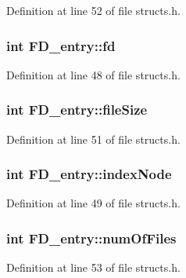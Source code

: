 Definition at line 52 of file structs.\-h.

\hypertarget{struct_f_d__entry_a9d5e0d0d64fc6fceda961322163b6620}{
\subsubsection[{fd}]{\setlength{\rightskip}{0pt plus 5cm}int F\-D\-\_\-entry\-::fd}}\label{struct_f_d__entry_a9d5e0d0d64fc6fceda961322163b6620}


Definition at line 48 of file structs.\-h.

\hypertarget{struct_f_d__entry_ab206b321649292d979ed9e30c7c9758e}{
\subsubsection[{file\-Size}]{\setlength{\rightskip}{0pt plus 5cm}int F\-D\-\_\-entry\-::file\-Size}}\label{struct_f_d__entry_ab206b321649292d979ed9e30c7c9758e}


Definition at line 51 of file structs.\-h.

\hypertarget{struct_f_d__entry_a8461f9539fc8eae9aa1d82a1bd6fe99b}{
\subsubsection[{index\-Node}]{\setlength{\rightskip}{0pt plus 5cm}int F\-D\-\_\-entry\-::index\-Node}}\label{struct_f_d__entry_a8461f9539fc8eae9aa1d82a1bd6fe99b}


Definition at line 49 of file structs.\-h.

\hypertarget{struct_f_d__entry_a2db15c840d91b43d3073b88e41d88fe9}{
\subsubsection[{num\-Of\-Files}]{\setlength{\rightskip}{0pt plus 5cm}int F\-D\-\_\-entry\-::num\-Of\-Files}}\label{struct_f_d__entry_a2db15c840d91b43d3073b88e41d88fe9}


Definition at line 53 of file structs.\-h.

